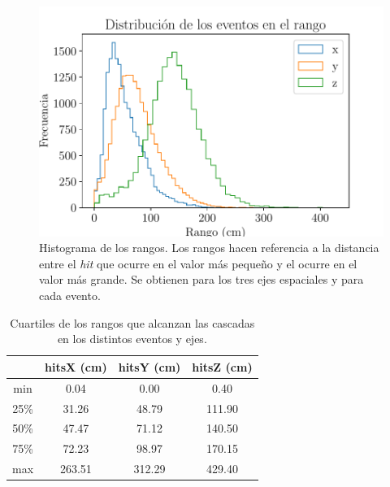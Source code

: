 \documentclass[a4paper,12pt,twoside,titlepage]{article}
\begin{document}
\begin{figure}[h!]
  \centering
  \includegraphics[scale=0.85]{hist_rango.pdf}
  \caption{Histograma de los rangos. Los rangos hacen referencia a la distancia entre el \textit{hit} que ocurre en el valor más pequeño y el ocurre en el valor más grande. Se obtienen para los tres ejes espaciales y para cada evento.}
  \label{fig:hist_rango}
\end{figure}

\begin{table}[h!]
  \centering
  \begin{tabular}{|c|c|c|c|}
  \hline
           &  hitsX (cm) &  hitsY (cm) &  hitsZ (cm) \\ \hline
  min      &        0.04 &        0.00 &        0.40 \\ \hline
  25\%     &       31.26 &       48.79 &      111.90 \\ \hline
  50\%     &       47.47 &       71.12 &      140.50 \\ \hline
  75\%     &       72.23 &       98.97 &      170.15 \\ \hline
  max      &      263.51 &      312.29 &      429.40 \\ \hline
\end{tabular}
\caption{Cuartiles de los rangos que alcanzan las cascadas en los distintos eventos y ejes.}
\label{tab:cuartiles_rango}
\end{table}
\end{document}
